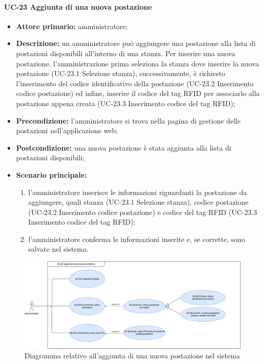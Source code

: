 \paragraph{UC-23 Aggiunta di una nuova postazione}
\begin{itemize}
    \item \textbf{Attore primario:} amministratore;
    \item \textbf{Descrizione:} un amministratore pu\`{o} aggiungere una postazione alla lista di postazioni disponibili all'interno di una stanza. Per inserire una nuova postazione, l'amministrazione prima seleziona la stanza dove inserire la nuova postazione (UC-23.1 Selezione stanza), successivamente, è richiesto l'inserimento del codice identificativo della postazione (UC-23.2 Inserimento codice postazione) ed infine, inserire il codice del tag RFID per associarlo alla postazione appena creata (UC-23.3 Inserimento codice del tag RFID);
    \item \textbf{Precondizione:} l'amministratore si trova nella pagina di gestione delle postazioni nell'applicazione web;
    \item \textbf{Postcondizione:} una nuova postazione \`{e} stata aggiunta alla lista di postazioni disponibili;
    \item \textbf{Scenario principale:}
    \begin{enumerate}
        \item l'amministratore inserisce le informazioni riguardanti la postazione da aggiungere, quali stanza (UC-23.1 Selezione stanza), codice postazione (UC-23.2 Inserimento codice postazione) e codice del tag RFID (UC-23.3 Inserimento codice del tag RFID);
        \item l'amministratore conferma le informazioni inserite e, se corrette, sono salvate nel sistema.
    \end{enumerate}
\end{itemize}

\begin{figure}[H]
    \centering
      \includegraphics[scale=0.30]{src/CasiDUso/immagini/AggiuntaPostazione.png}
    \caption{Diagramma relativo all'aggiunta di una nuova postazione nel sistema}
\end{figure}

